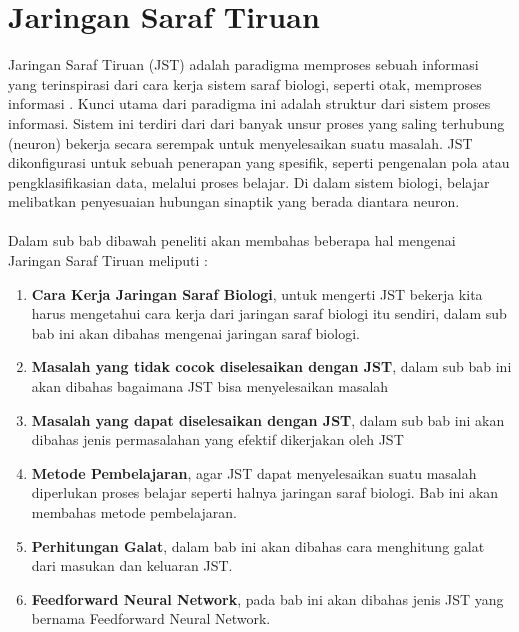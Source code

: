 \section{Jaringan Saraf Tiruan}
Jaringan Saraf Tiruan (JST) adalah paradigma memproses sebuah informasi yang terinspirasi dari cara kerja sistem saraf biologi, seperti otak, memproses informasi \cite{WhatisNN:2015}. Kunci utama dari paradigma ini adalah struktur dari sistem proses informasi. Sistem ini terdiri dari dari banyak unsur proses yang saling terhubung (neuron) bekerja secara serempak untuk menyelesaikan suatu masalah.  JST dikonfigurasi untuk sebuah penerapan yang spesifik, seperti  pengenalan pola atau pengklasifikasian data, melalui proses belajar. Di dalam sistem biologi, belajar melibatkan penyesuaian hubungan sinaptik yang berada diantara neuron.\\\\
Dalam sub bab dibawah peneliti akan membahas beberapa hal mengenai Jaringan Saraf Tiruan meliputi :
\begin{enumerate}
	\item \textbf{Cara Kerja Jaringan Saraf Biologi}, untuk mengerti JST bekerja kita harus mengetahui cara kerja dari jaringan saraf biologi itu sendiri, dalam sub bab ini akan dibahas mengenai jaringan saraf biologi.
	\item \textbf{Masalah yang tidak cocok diselesaikan dengan JST}, dalam sub bab ini akan dibahas bagaimana JST bisa menyelesaikan masalah
	\item \textbf{Masalah yang dapat diselesaikan dengan JST}, dalam sub bab ini akan dibahas jenis permasalahan yang efektif dikerjakan oleh JST
	\item \textbf{Metode Pembelajaran}, agar JST dapat menyelesaikan suatu masalah diperlukan proses belajar seperti halnya jaringan saraf biologi. Bab ini akan membahas metode pembelajaran.
	\item \textbf{Perhitungan Galat}, dalam bab ini akan dibahas cara menghitung galat dari masukan dan keluaran JST.
	\item \textbf{Feedforward Neural Network}, pada bab ini akan dibahas jenis JST yang bernama Feedforward Neural Network.
\end{enumerate}
